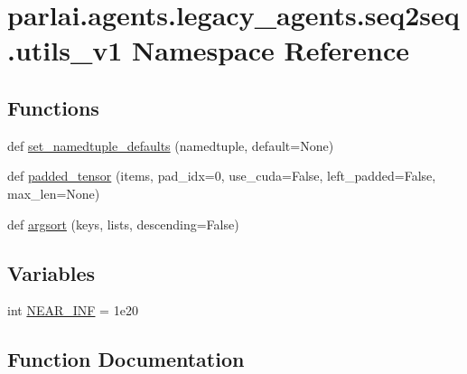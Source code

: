 \hypertarget{namespaceparlai_1_1agents_1_1legacy__agents_1_1seq2seq_1_1utils__v1}{}\section{parlai.\+agents.\+legacy\+\_\+agents.\+seq2seq.\+utils\+\_\+v1 Namespace Reference}
\label{namespaceparlai_1_1agents_1_1legacy__agents_1_1seq2seq_1_1utils__v1}
\subsection*{Functions}
\begin{DoxyCompactItemize}
\item 
def \hyperlink{namespaceparlai_1_1agents_1_1legacy__agents_1_1seq2seq_1_1utils__v1_a17553492abb2e671bc3fc58e1e3a96b0}{set\+\_\+namedtuple\+\_\+defaults} (namedtuple, default=None)
\item 
def \hyperlink{namespaceparlai_1_1agents_1_1legacy__agents_1_1seq2seq_1_1utils__v1_adb5a414ae439f14c54e8c760b91cc4c8}{padded\+\_\+tensor} (items, pad\+\_\+idx=0, use\+\_\+cuda=False, left\+\_\+padded=False, max\+\_\+len=None)
\item 
def \hyperlink{namespaceparlai_1_1agents_1_1legacy__agents_1_1seq2seq_1_1utils__v1_a1521e559b740f741ebb47b8755202bb2}{argsort} (keys, lists, descending=False)
\end{DoxyCompactItemize}
\subsection*{Variables}
\begin{DoxyCompactItemize}
\item 
int \hyperlink{namespaceparlai_1_1agents_1_1legacy__agents_1_1seq2seq_1_1utils__v1_ab1b867624df2a08ba94de6bd5a7acca4}{N\+E\+A\+R\+\_\+\+I\+NF} = 1e20
\end{DoxyCompactItemize}


\subsection{Function Documentation}
\mbox{\label{namespaceparlai_1_1agents_1_1legacy__agents_1_1seq2seq_1_1utils__v1_a1521e559b740f741ebb47b8755202bb2}} 
